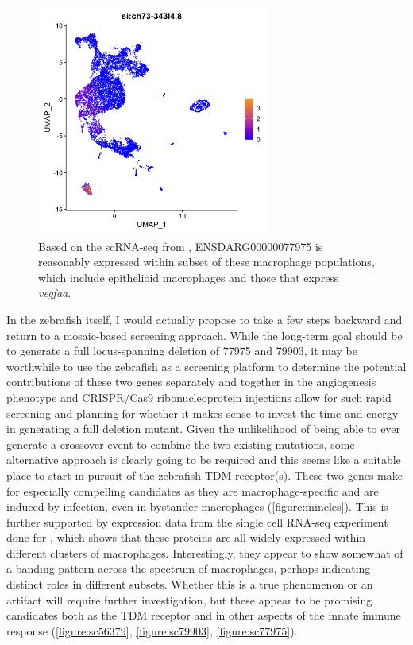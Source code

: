 \begin{figure}
\centering
\includegraphics[height=3in]{images/wtCombo_si:ch73-343l4.8_GEPlot.png
}
\caption[Single-cell RNA-seq expression profile for 77975]{Based on the scRNA-seq from \citet{Cronan2021}, ENSDARG00000077975 is reasonably expressed within subset of these macrophage populations, which include epithelioid macrophages and those that express \textit{vegfaa}.}
\label{figure:sc77975}
\end{figure}

In the zebrafish itself, I would actually propose to take a few steps backward and return to a mosaic\hyp{}based screening approach. While the long\hyp{}term goal should be to generate a full locus\hyp{}spanning deletion of 77975 and 79903, it may be worthwhile to use the zebrafish as a screening platform to determine the potential contributions of these two genes separately and together in the angiogenesis phenotype and CRISPR/Cas9 ribonucleoprotein injections allow for such rapid screening and planning for whether it makes sense to invest the time and energy in generating a full deletion mutant. Given the unlikelihood of being able to ever generate a crossover event to combine the two existing mutations, some alternative approach is clearly going to be required and this seems like a suitable place to start in pursuit of the zebrafish TDM receptor(s). These two genes make for especially compelling candidates as they are macrophage\hyp{}specific and are induced by infection, even in bystander macrophages (\autoref{figure:mincles}). This is further supported by expression data from the single cell RNA-seq experiment done for \citet{Cronan2021}, which shows that these proteins are all widely expressed within different clusters of macrophages. Interestingly, they appear to show somewhat of a banding pattern across the spectrum of macrophages, perhaps indicating distinct roles in different subsets. Whether this is a true phenomenon or an artifact will require further investigation, but these appear to be promising candidates both as the TDM receptor and in other aspects of the innate immune response (\autoref{figure:sc56379}, \autoref{figure:sc79903}, \autoref{figure:sc77975}). 

